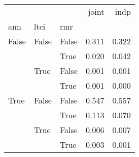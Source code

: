 \begin{tabular}{lllrr}
\toprule
     &      &      &  joint &   indp \\
ann & ltci & rmr &        &        \\
\midrule
False & False & False &  0.311 &  0.322 \\
     &      & True &  0.020 &  0.042 \\
     & True & False &  0.001 &  0.001 \\
     &      & True &  0.001 &  0.000 \\
True & False & False &  0.547 &  0.557 \\
     &      & True &  0.113 &  0.070 \\
     & True & False &  0.006 &  0.007 \\
     &      & True &  0.003 &  0.001 \\
\bottomrule
\end{tabular}

